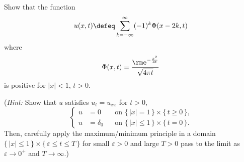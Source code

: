 \begin{problem}
  Show that the function
  \[
    u(x,t)\defeq\sum_{k=-\infty}^\infty (-1)^k\Phi(x-2k,t)
  \]
  where
  \[
    \Phi(x,t)=\frac{\rme^{-\frac{x^2}{4t}}}{\sqrt{4\pi t}}
  \]
  is positive for \(|x|<1\), \(t>0\).

  \noindent (\emph{Hint:} Show that \(u\) satisfies \(u_t=u_{xx}\) for
  \(t>0\),
  \[
    \left\{
      \begin{aligned}
        u&=0&&\text{on \(\{\,|x|=1\,\}\times\{\,t\geq 0\,\}\),}\\
        u&=\delta_0&&\text{on \(\{\,|x|\leq 1\,\}\times\{\,t=0\,\}\).}
      \end{aligned}
    \right.
  \]
  Then, carefully apply the maximum/minimum principle in a domain
  \(\{\,|x|\leq 1\,\}\times\{\,\varepsilon\leq t\leq T\,\}\) for small
  \(\varepsilon>0\) and large \(T>0\) pass to the limit as \(\varepsilon\to
  0^+\) and \(T\to\infty\).)
\end{problem}
